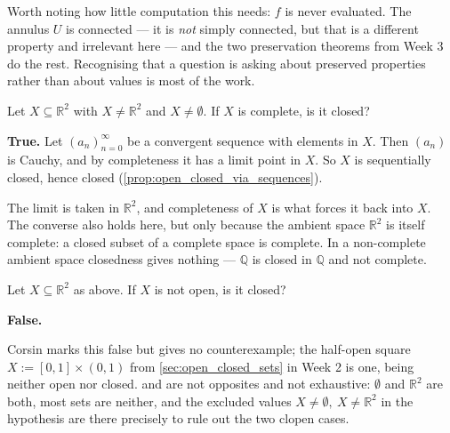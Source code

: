 \begin{ainote}
Worth noting how little computation this needs: $f$ is never evaluated. The annulus $U$ is
connected --- it is \emph{not} simply connected, but that is a different property and irrelevant
here --- and the two preservation theorems from Week 3 do the rest. Recognising that a question
is asking about preserved properties rather than about values is most of the work.
\end{ainote}

\begin{question}
\label{q:week08_q2}
Let $X \subseteq \mathbb{R}^2$ with $X \neq \mathbb{R}^2$ and $X \neq \emptyset$. If $X$ is
complete, is it closed?
\end{question}

\begin{answer}
\textbf{True.} Let $(a_n)_{n=0}^\infty$ be a convergent sequence with elements in $X$. Then
$(a_n)$ is Cauchy, and by completeness it has a limit point in $X$. So $X$ is sequentially
closed, hence closed (\cref{prop:open_closed_via_sequences}).
\end{answer}

\begin{ainote}
The limit is taken in $\mathbb{R}^2$, and completeness of $X$ is what forces it back into $X$.
The converse also holds here, but only because the ambient space $\mathbb{R}^2$ is itself
complete: a closed subset of a complete space is complete. In a non-complete ambient space
closedness gives nothing --- $\mathbb{Q}$ is closed in $\mathbb{Q}$ and not complete.
\end{ainote}

\begin{question}
\label{q:week08_q3}
Let $X \subseteq \mathbb{R}^2$ as above. If $X$ is not open, is it closed?
\end{question}

\begin{answer}
\textbf{False.}
\end{answer}

\begin{ainote}
Corsin marks this false but gives no counterexample; the half-open square
$X := [0,1] \times (0,1)$ from \cref{sec:open_closed_sets} in Week 2 is one, being neither open
nor closed.  and  are not opposites and not exhaustive: $\emptyset$ and
$\mathbb{R}^2$ are both, most sets are neither, and the excluded values
$X \neq \emptyset,\ X \neq \mathbb{R}^2$ in the hypothesis are there precisely to rule out the
two clopen cases.
\end{ainote}

